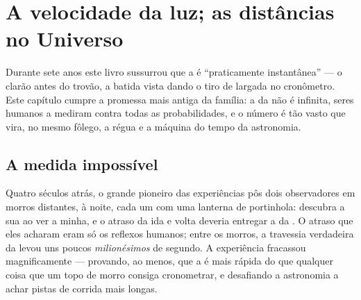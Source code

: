 \chapter{A velocidade da luz; as distâncias no Universo}\label{ch:g8:speed-of-light}

Durante sete anos este livro sussurrou que a  é ``praticamente
instantânea'' --- o clarão antes do trovão, a batida vista dando o
tiro de largada no cronômetro. Este capítulo cumpre a promessa mais
antiga da família: a  da  não é infinita, seres humanos a
mediram contra todas as probabilidades, e o número é tão vasto que
vira, no mesmo fôlego, a régua e a máquina do tempo da astronomia.

\section{A medida impossível}

\begin{example}\label{ex:g8:speed-of-light:galileo}
Quatro séculos atrás, o grande pioneiro das experiências pôs dois
observadores em morros distantes, à noite, cada um com uma lanterna de
portinhola: descubra a sua ao ver a minha, e o atraso da ida e volta
deveria entregar a  da . O atraso que eles acharam eram
só os reflexos humanos; entre os morros, a travessia verdadeira da 
levou uns poucos \emph{milionésimos} de segundo. A experiência
fracassou magnificamente --- provando, ao menos, que a  é mais
rápida do que qualquer coisa que um topo de morro consiga cronometrar,
e desafiando a astronomia a achar pistas de corrida mais longas.
\end{example}

